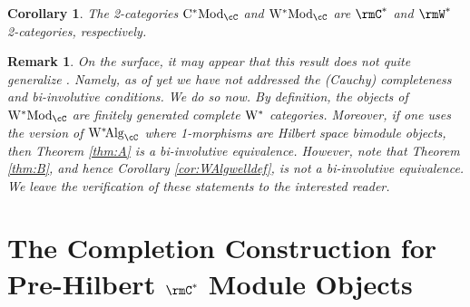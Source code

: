\documentclass[11pt,reqno]{amsart}
\DeclareMathOperator{\CMod}{C^*Mod}
\DeclareMathOperator{\WMod}{W^*Mod}
\DeclareMathOperator{\WAlg}{W^*\!Alg}
\numberwithin{equation}{section}
\theoremstyle{plain}
\newtheorem{cor}[thm]{Corollary}
\newtheorem{rmk}[thm]{Remark}
\begin{document}
\begin{cor}
The 2-categories $\CMod_{\cC}$ and $\WMod_{\cC}$ are $\rmC^*$ and $\rmW^*$ 2-categories, respectively.
\end{cor}

\begin{rmk} \label{rmk:HNPgeneralized}
On the surface, it may appear that this result does not quite generalize \cite[Theorem~7.4]{HNP24}.
Namely, as of yet we have not addressed the (Cauchy) completeness and bi-involutive conditions.
We do so now.
By definition, the objects of $\WMod_{\cC}$ are finitely generated complete $\rm W^*$ categories.
Moreover, if one uses the version of $\WAlg_{\cC}$ where 1-morphisms are Hilbert space bimodule objects, then Theorem \ref{thm:A} is a bi-involutive equivalence.
However, note that Theorem \ref{thm:B}, and hence Corollary \ref{cor:WAlgwelldef}, is \emph{not} a bi-involutive equivalence.
We leave the verification of these statements to the interested reader.
\end{rmk}

\appendix

\section{The Completion Construction for Pre-Hilbert $\rmC^*$ Module Objects} \label{app:completionconstruction}
\end{document}
